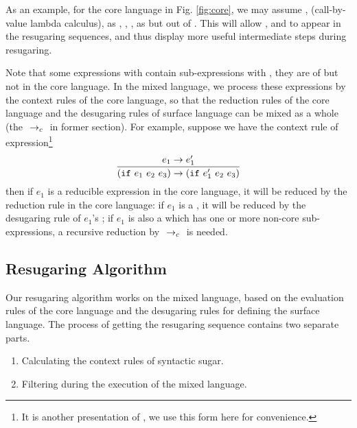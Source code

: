 


As an example, for the core language in Fig.  \ref{fig:core},
we may assume , \m{$\lambda$} (call-by-value lambda calculus),  as , , ,  as  but out of . This will allow , \m{$\lambda$} and  to appear in the resugaring sequences, and thus display more useful intermediate steps during resugaring.

Note that some expressions with  contain sub-expressions with , they are of  but not in the core language. In the mixed language, we process these expressions by the context rules of the core language, so that the reduction rules of the core language and the desugaring rules of surface language can be mixed as a whole (the $~\rightarrow_c~$ in former section). For example, suppose we have the context rule of  expression\footnote{It is another presentation of , we use this form here for convenience.}
\[
\infer{(\m{if}~e_1~e_2~e_3) \rightarrow (\m{if}~e_1'~e_2~e_3)}{e_1 \rightarrow e_1'}
\]
then if $e_1$ is a reducible expression in the core language, it will be reduced by the reduction rule in the core language: if $e_1$ is a , it will be reduced by the desugaring rule of $e_1$'s ; if $e_1$ is also a  which has one or more non-core sub-expressions, a recursive reduction by $~\rightarrow_c~$ is needed.


\subsection{Resugaring Algorithm}

Our resugaring algorithm works on the mixed language, based on the evaluation rules of the core language and the desugaring rules for defining the surface language. The process of  getting the resugaring sequence contains two separate parts.

\begin{enumerate}
\item Calculating the context rules of syntactic sugar.
\item Filtering  during the execution of the mixed language.
\end{enumerate}

